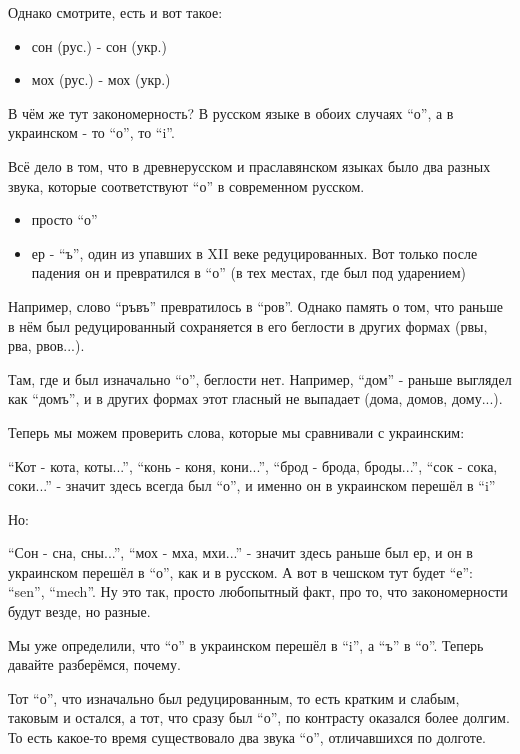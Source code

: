 Однако смотрите, есть и вот такое:

\begin{itemize}
  \item сон (рус.) - сон (укр.)
  \item мох (рус.) - мох (укр.)
\end{itemize}

В чём же тут закономерность? В русском языке в обоих случаях \enquote{о}, а в
украинском - то \enquote{о}, то \enquote{i}.

Всё дело в том, что в древнерусском и праславянском языках было два разных
звука, которые соответствуют \enquote{о} в современном русском.

\begin{itemize}
  \item просто \enquote{о}
  \item ер - \enquote{ъ}, один из упавших в XII веке редуцированных. Вот только после падения он и превратился в \enquote{о} (в тех местах, где был под ударением)
\end{itemize}

Например, слово \enquote{ръвъ} превратилось в \enquote{ров}. Однако память о
том, что раньше в нём был редуцированный сохраняется в его беглости в других
формах (рвы, рва, рвов...).

Там, где и был изначально \enquote{о}, беглости нет. Например, \enquote{дом} -
раньше выглядел как \enquote{домъ}, и в других формах этот гласный не выпадает
(дома, домов, дому...).

Теперь мы можем проверить слова, которые мы сравнивали с украинским:

\enquote{Кот - кота, коты...}, \enquote{конь - коня, кони...}, \enquote{брод - брода, броды...}, \enquote{сок -
сока, соки...} - значит здесь всегда был \enquote{о}, и именно он в украинском перешёл
в \enquote{i}

Но:

\enquote{Сон - сна, сны...}, \enquote{мох - мха, мхи...} - значит здесь раньше
был ер, и он в украинском перешёл в \enquote{о}, как и в русском. А вот в
чешском тут будет \enquote{е}: \enquote{sen}, \enquote{mech}. Ну это так,
просто любопытный факт, про то, что закономерности будут везде, но разные.

Мы уже определили, что \enquote{о} в украинском перешёл в \enquote{i}, а
\enquote{ъ} в \enquote{о}. Теперь давайте разберёмся, почему.

Тот \enquote{о}, что изначально был редуцированным, то есть кратким и слабым, таковым и
остался, а тот, что сразу был \enquote{о}, по контрасту оказался более долгим. То есть
какое-то время существовало два звука \enquote{о}, отличавшихся по долготе.

